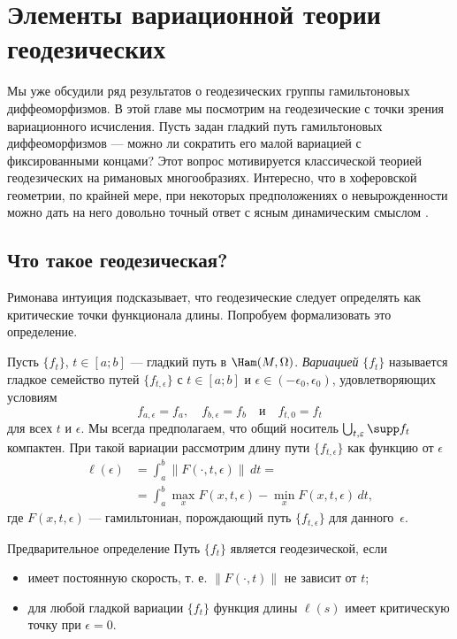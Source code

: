 \chapter[Геодезические]{Элементы вариационной теории геодезических}\label{chap:12}

Мы уже обсудили ряд результатов о геодезических группы гамильтоновых диффеоморфизмов.
В этой главе мы посмотрим на геодезические с точки зрения вариационного исчисления.
Пусть задан гладкий путь гамильтоновых диффеоморфизмов --- можно ли сократить его малой вариацией с фиксированными концами?
Этот вопрос мотивируется классической теорией геодезических на римановых многообразиях.
Интересно, что в хоферовской геометрии, по крайней мере, при некоторых предположениях о невырожденности можно дать на него довольно точный ответ с ясным динамическим смыслом \cite{U}.

\section{Что такое геодезическая?}

Римонава интуиция подсказывает, что геодезические следует определять как критические точки функционала длины.
Попробуем формализовать это определение.

Пусть $\{f_t\}$, $t\in[a; b]$ --- гладкий путь в $\Ham(M,\Omega)$.
\emph{Вариацией} $\{f_t\}$ называется гладкое семейство путей $\{f_{t,\epsilon}\}$ с $t \in [a; b]$ и $\epsilon \in (-\epsilon_0, \epsilon_0)$, удовлетворяющих условиям
\[f_{a,\epsilon} = f_a,\quad f_{b,\epsilon} = f_b\quad\text{и}\quad f_{t,0} = f_t\]
для всех $t$ и $\epsilon$.
Мы всегда предполагаем, что общий носитель $\bigcup_{t,\epsilon}\supp f_t$ компактен.
При такой вариации рассмотрим длину пути $\{f_{t,\epsilon}\}$ как функцию от $\epsilon$ \index[symb]{$\ell(\epsilon)$}
\begin{align*}
\ell(\epsilon)&=\int_a^b\|F(\cdot,t,\epsilon)\|\,dt=
\\
&=\int_a^b \max_x F(x,t,\epsilon)-\min_x F(x,t,\epsilon)\,dt,
\end{align*} 
где $F(x, t, \epsilon)$ --- гамильтониан, порождающий путь $\{f_{t,\epsilon}\}$ для данного~$\epsilon$.

\begin{ex}{Предварительное определение}\label{12.1.A}
Путь $\{f_t\}$ является геодезической, если
\begin{itemize}
\item имеет постоянную скорость, т. е. $\|F(\cdot, t)\|$ не зависит от $t$;
\item для любой гладкой вариации $\{f_t\}$ функция длины $\ell(s)$ имеет критическую точку при $\epsilon = 0$.
\end{itemize}
\end{ex}

